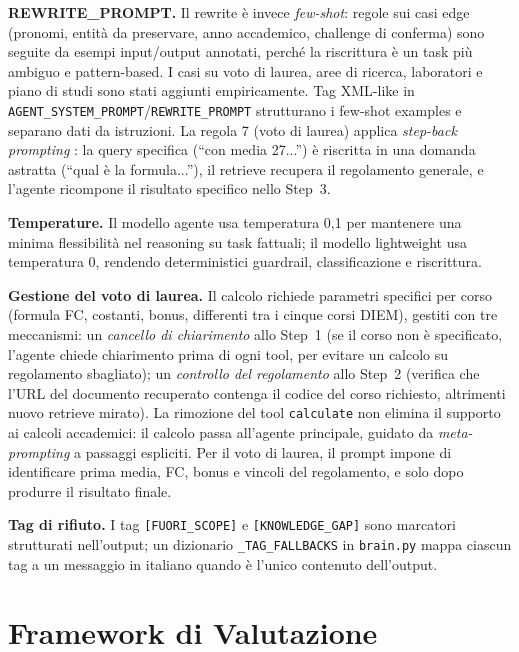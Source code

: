 \documentclass[11pt,a4paper]{article}
\newcommand{\code}[1]{\texttt{\small#1}}
\begin{document}
\textbf{REWRITE\_PROMPT.} Il rewrite è invece \emph{few-shot}: regole sui casi edge
(pronomi, entità da preservare, anno accademico, challenge di conferma) sono seguite da
esempi input/output annotati, perché la riscrittura è un task più ambiguo e pattern-based.
I casi su voto di laurea, aree di ricerca, laboratori e piano di studi sono stati aggiunti
empiricamente. Tag XML-like in \code{AGENT\_SYSTEM\_PROMPT}/\code{REWRITE\_PROMPT}
strutturano i few-shot examples e separano dati da istruzioni.
La regola 7 (voto di laurea) applica \emph{step-back prompting} \citep{zheng2023stepback}:
la query specifica (``con media 27...'') è riscritta in una domanda astratta (``qual è la
formula...''), il retrieve recupera il regolamento generale, e l'agente ricompone il
risultato specifico nello Step~3.

\textbf{Temperature.} Il modello agente usa temperatura 0,1 per mantenere una minima
flessibilità nel reasoning su task fattuali; il modello lightweight usa temperatura 0,
rendendo deterministici guardrail, classificazione e riscrittura.

\textbf{Gestione del voto di laurea.} Il calcolo richiede parametri specifici per corso
(formula FC, costanti, bonus, differenti tra i cinque corsi DIEM), gestiti con tre
meccanismi: un \emph{cancello di chiarimento} allo Step~1 (se il corso non è specificato,
l'agente chiede chiarimento prima di ogni tool, per evitare un calcolo su regolamento
sbagliato); un \emph{controllo del regolamento} allo Step~2 (verifica che l'URL del
documento recuperato contenga il codice del corso richiesto, altrimenti nuovo retrieve
mirato). La rimozione del tool \code{calculate} non elimina il supporto ai calcoli
accademici: il calcolo passa all'agente principale, guidato da \emph{meta-prompting}
\citep{suzgun2024metaprompting} a passaggi espliciti. Per il voto di laurea, il prompt
impone di identificare prima media, FC, bonus e vincoli del regolamento, e solo dopo
produrre il risultato finale.

\textbf{Tag di rifiuto.} I tag \texttt{[FUORI\_SCOPE]} e \texttt{[KNOWLEDGE\_GAP]} sono
marcatori strutturati nell'output; un dizionario \code{\_TAG\_FALLBACKS} in
\code{brain.py} mappa ciascun tag a un messaggio in italiano quando è l'unico contenuto
dell'output.

\section{Framework di Valutazione}
\label{sec:evaluation}
\end{document}
